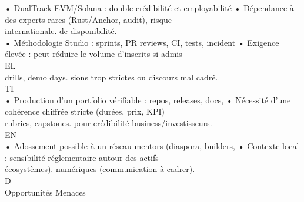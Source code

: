 \documentclass[12pt,landscape,a4paper]{article}
\begin{document}
• DualTrack EVM/Solana : double crédibilité et employabilité • Dépendance à des experts rares (Rust/Anchor, audit), risque\\
internationale.                                                  de disponibilité.\\
• Méthodologie Studio : sprints, PR reviews, CI, tests, incident • Exigence élevée : peut réduire le volume d’inscrits si admis-\\
\vspace{0.5em}
\vspace{0.5em}
\vspace{0.5em}
\vspace{0.5em}
EL\\
drills, demo days.                                               sions trop strictes ou discours mal cadré.\\
\vspace{0.5em}
\vspace{0.5em}
\vspace{0.5em}
\vspace{0.5em}
TI\\
• Production d’un portfolio vérifiable : repos, releases, docs,  • Nécessité d’une cohérence chiffrée stricte (durées, prix, KPI)\\
rubrics, capstones.                                              pour crédibilité business/investisseurs.\\
\vspace{0.5em}
\vspace{0.5em}
\vspace{0.5em}
\vspace{0.5em}
EN\\
• Adossement possible à un réseau mentors (diaspora, builders, • Contexte local : sensibilité réglementaire autour des actifs\\
écosystèmes).                                                    numériques (communication à cadrer).\\
\vspace{0.5em}
\vspace{0.5em}
\vspace{0.5em}
\vspace{0.5em}
D\\
Opportunités                                                          Menaces\\
\vspace{0.5em}
\vspace{0.5em}
\vspace{0.5em}
\vspace{0.5em}
\end{document}
